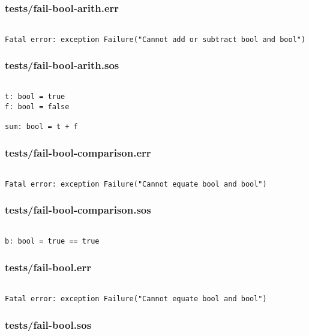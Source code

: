\documentclass[main.tex]{subfiles}
\begin{document}
\subsubsection{tests/fail-bool-arith.err}

\begin{lstlisting}

Fatal error: exception Failure("Cannot add or subtract bool and bool")
\end{lstlisting}

\subsubsection{tests/fail-bool-arith.sos}

\begin{lstlisting}

t: bool = true
f: bool = false

sum: bool = t + f
\end{lstlisting}

\subsubsection{tests/fail-bool-comparison.err}

\begin{lstlisting}

Fatal error: exception Failure("Cannot equate bool and bool")
\end{lstlisting}

\subsubsection{tests/fail-bool-comparison.sos}

\begin{lstlisting}

b: bool = true == true
\end{lstlisting}

\subsubsection{tests/fail-bool.err}

\begin{lstlisting}

Fatal error: exception Failure("Cannot equate bool and bool")
\end{lstlisting}

\subsubsection{tests/fail-bool.sos}
\end{document}
